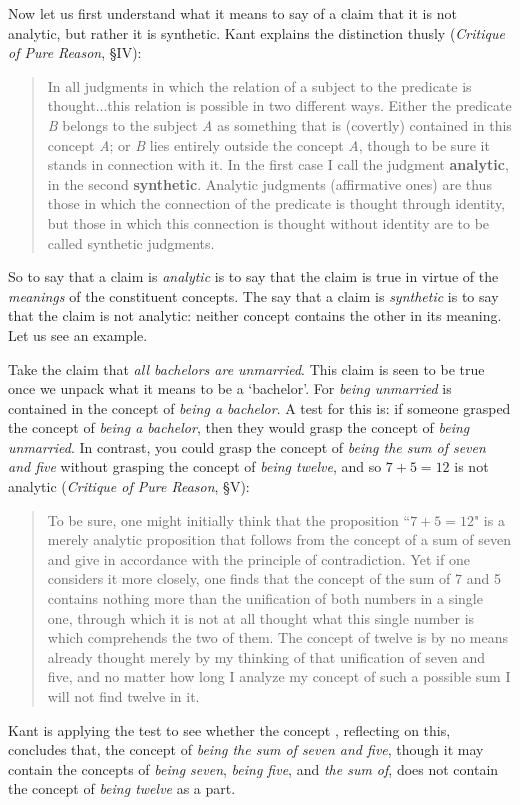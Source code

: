 \documentclass[oneside,letterpaper,12pt]{book}
\begin{document}
Now let us first understand what it means to say of a claim that it is not analytic, but rather it is synthetic. Kant explains the distinction thusly (\textit{Critique of Pure Reason}, \S IV):
\begin{quote}
	In all judgments in which the relation of a subject to the predicate is thought...this relation is possible in two different ways. Either the predicate \textit{B} belongs to the subject \textit{A} as something that is (covertly) contained in this concept \textit{A}; or \textit{B} lies entirely outside the concept \textit{A}, though to be sure it stands in connection with it. In the first case I call the judgment \textbf{analytic}, in the second \textbf{synthetic}. Analytic judgments (affirmative ones) are thus those in which the connection of the predicate is thought through identity, but those in which this connection is thought without identity are to be called synthetic judgments. 
\end{quote}
So to say that a claim is \textit{analytic} is to say that the claim is true in virtue of the \textit{meanings} of the constituent concepts. The say that a claim is \textit{synthetic} is to say that the claim is not analytic: neither concept contains the other in its meaning. Let us see an example.

Take the claim that \textit{all bachelors are unmarried}. This claim is seen to be true once we unpack what it means to be a `bachelor'. For \textit{being unmarried} is contained in the concept of \textit{being a bachelor}. A test for this is: if someone grasped the concept of \textit{being a bachelor}, then they would grasp the concept of \textit{being unmarried}. In contrast, you could grasp the concept of \textit{being the sum of seven and five} without grasping the concept of \textit{being twelve}, and so $7+5=12$ is not analytic (\textit{Critique of Pure Reason}, \S V):
\begin{quote}
	To be sure, one might initially think that the proposition ``$7 + 5 = 12$" is a merely analytic proposition that follows from the concept of a sum of seven and give in accordance with the principle of contradiction. Yet if one considers it more closely, one finds that the concept of the sum of 7 and 5 contains nothing more than the unification of both numbers in a single one, through which it is not at all thought what this single number is which comprehends the two of them. The concept of twelve is by no means already thought merely by my thinking of that unification of seven and five, and no matter how long I analyze my concept of such a possible sum I will not find twelve in it. 
\end{quote}
Kant is applying the test to see whether the concept , reflecting on this, concludes that, the concept of \textit{being the sum of seven and five}, though it may contain the concepts of \textit{being seven}, \textit{being five}, and \textit{the sum of}, does not contain the concept of \textit{being twelve} as a part.
\end{document}

